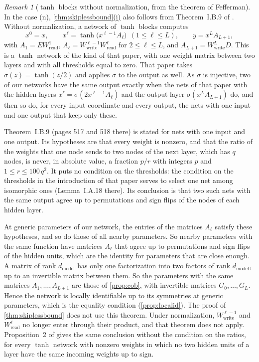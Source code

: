 \documentclass[10pt]{article}
\theoremstyle{definition}
\theoremstyle{remark}
\newtheorem{remark}[theorem]{Remark}
\newcommand{\Wread}{W_{\mathrm{read}}}
\newcommand{\Wwrite}{W_{\mathrm{write}}}
\newcommand{\dm}{d_{\mathrm{model}}}
\DeclareRobustCommand{\cpref}[2]{\hyperref[#1:#2]{\cref*{#1}(#2)}}
\begin{document}
\begin{remark}[$\tanh$ blocks without normalization, from the theorem of Fefferman]\label{rem:fefferman}
In the case (n), \cpref{thm:skiplessbound}{i} also follows from Theorem~I.B.9 of \citet{fefferman1994}. Without normalization, a network of $\tanh$ blocks computes
\[
x^0 = x,\qquad x^\ell = \tanh\big(x^{\ell-1}A_\ell\big)\ \ (1 \le \ell \le L),\qquad y = x^LA_{L+1},
\]
with $A_1 = E\Wread^{1}$, $A_\ell = \Wwrite^{\ell-1}\Wread^{\ell}$ for $2 \le \ell \le L$, and $A_{L+1} = \Wwrite^{L}D$. This is a $\tanh$ network of the kind of that paper, with one weight matrix between two layers and with all thresholds equal to zero. That paper takes $\sigma(z) = \tanh(z/2)$ and applies $\sigma$ to the output as well. As $\sigma$ is injective, two of our networks have the same output exactly when the nets of that paper with the hidden layers $x^\ell = \sigma(2x^{\ell-1}A_\ell)$ and the output layer $\sigma(x^LA_{L+1})$ do, and then so do, for every input coordinate and every output, the nets with one input and one output that keep only these.

Theorem~I.B.9 (pages 517 and 518 there) is stated for nets with one input and one output. Its hypotheses are that every weight is nonzero, and that the ratio of the weights that one node sends to two nodes of the next layer, which has $q$ nodes, is never, in absolute value, a fraction $p/r$ with integers $p$ and $1 \le r \le 100\,q^2$. It puts no condition on the thresholds: the condition on the thresholds in the introduction of that paper serves to select one net among isomorphic ones (Lemma~I.A.18 there). Its conclusion is that two such nets with the same output agree up to permutations and sign flips of the nodes of each hidden layer.

At generic parameters of our network, the entries of the matrices $A_\ell$ satisfy these hypotheses, and so do those of all nearby parameters. So nearby parameters with the same function have matrices $A_\ell$ that agree up to permutations and sign flips of the hidden units, which are the identity for parameters that are close enough. A matrix of rank $\dm$ has only one factorization into two factors of rank $\dm$, up to an invertible matrix between them. So the parameters with the same matrices $A_1, \dots, A_{L+1}$ are those of \cref{prop:cob}, with invertible matrices $G_0, \dots, G_L$. Hence the network is locally identifiable up to its symmetries at generic parameters, which is the equality condition (\cref{prop:localid}). The proof of \cref{thm:skiplessbound} does not use this theorem. Under normalization, $\Wwrite^{\ell-1}$ and $\Wread^{\ell}$ no longer enter through their product, and that theorem does not apply. Proposition~2 of \citet{vlacic2020affine} gives the same conclusion without the condition on the ratios, for every $\tanh$ network with nonzero weights in which no two hidden units of a layer have the same incoming weights up to sign.
\end{remark}
\end{document}
